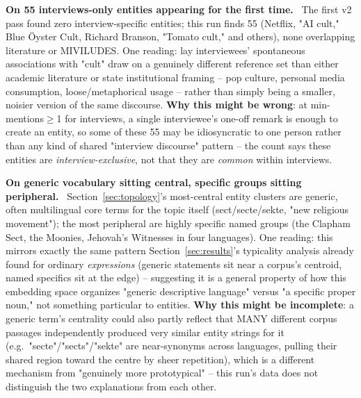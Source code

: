 \documentclass[11pt,a4paper]{article}
\newenvironment{interpbox}[1][Possible interpretation]
  {\par\vspace{6pt}\noindent{\color{interpline}\rule{\linewidth}{0.8pt}}\par\vspace{3pt}
   \noindent\small\textcolor{interpline}{\textbf{#1.}}\ \ignorespaces}
  {\par\vspace{3pt}\noindent{\color{interpline}\rule{\linewidth}{0.8pt}}\vspace{6pt}\par}
\begin{document}
\begin{interpbox}[On 55 interviews-only entities appearing for the first time]
The first v2 pass found zero interview-specific entities; this run finds
55 (Netflix, "AI cult," Blue \"Oyster Cult, Richard Branson, "Tomato
cult," and others), none overlapping literature or MIVILUDES. One
reading: lay interviewees' spontaneous associations with "cult" draw on
a genuinely different reference set than either academic literature or
state institutional framing -- pop culture, personal media consumption,
loose/metaphorical usage -- rather than simply being a smaller, noisier
version of the same discourse. \textbf{Why this might be wrong}: at
min-mentions$\geq$1 for interviews, a single interviewee's one-off
remark is enough to create an entity, so some of these 55 may be
idiosyncratic to one person rather than any kind of shared "interview
discourse" pattern -- the count says these entities are
\emph{interview-exclusive}, not that they are \emph{common} within
interviews.
\end{interpbox}

\begin{interpbox}[On generic vocabulary sitting central, specific groups sitting peripheral]
Section~\ref{sec:topology}'s most-central entity clusters are generic,
often multilingual core terms for the topic itself (sect/secte/sekte,
"new religious movement"); the most peripheral are highly specific named
groups (the Clapham Sect, the Moonies, Jehovah's Witnesses in four
languages). One reading: this mirrors exactly the same pattern
Section~\ref{sec:results}'s typicality analysis already found for
ordinary \emph{expressions} (generic statements sit near a corpus's
centroid, named specifics sit at the edge) -- suggesting it is a general
property of how this embedding space organizes "generic descriptive
language" versus "a specific proper noun," not something particular to
entities. \textbf{Why this might be incomplete}: a generic term's
centrality could also partly reflect that MANY different corpus passages
independently produced very similar entity strings for it (e.g.\
"secte"/"sects"/"sekte" are near-synonyms across languages, pulling their
shared region toward the centre by sheer repetition), which is a
different mechanism from "genuinely more prototypical" -- this run's
data does not distinguish the two explanations from each other.
\end{interpbox}
\end{document}
